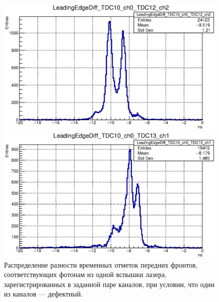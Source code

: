 \begin{figure}
\begin{minipage}[b]{0.495\textwidth}
\includegraphics[width=1.0\textwidth]{pictures/LeadingEdgeDiff_TDC10_ch0_TDC12_ch2.eps}
\end{minipage}
\hspace{0.01\textwidth}
\begin{minipage}[b]{0.495\textwidth}
\includegraphics[width=1.0\textwidth]{pictures/LeadingEdgeDiff_TDC10_ch0_TDC13_ch1.eps}
\end{minipage}
\caption{Распределение разности временных отметок передних фронтов, соответствующих фотонам из одной вспышки лазера, зарегистрированных в заданной паре каналов, при условии, что один из каналов --- дефектный.}
\label{fig:LeadingEdgeDiffMultiplePeaks}
\end{figure}





